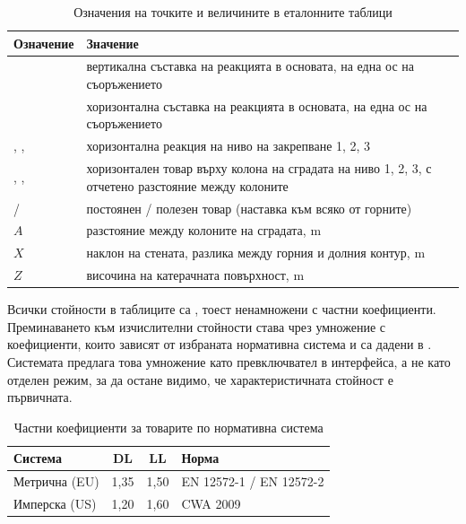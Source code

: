 \begin{table}[htbp]
\centering
\caption{Означения на точките и величините в еталонните таблици}
\label{tab:symbols}
{\fontsize{10}{12}\selectfont
\begin{tabular}{@{}lL{9.6cm}@{}}
\toprule
\textbf{Означение} & \textbf{Значение} \\
\midrule
{} & вертикална съставка на реакцията в основата, на една ос на съоръжението \\
 & хоризонтална съставка на реакцията в основата, на една ос на съоръжението \\
, ,  & хоризонтална реакция на ниво на закрепване 1, 2, 3 \\
, ,  & хоризонтален товар върху колона на сградата на ниво 1, 2, 3, с отчетено разстояние между колоните \\
 /  & постоянен / полезен товар (наставка към всяко от горните) \\
$A$ & разстояние между колоните на сградата, m \\
$X$ & наклон на стената, разлика между горния и долния контур, m \\
$Z$ & височина на катерачната повърхност, m \\
\bottomrule
\end{tabular}}
\end{table}

Всички стойности в таблиците са , тоест ненамножени с частни
коефициенти. Преминаването към изчислителни стойности става чрез умножение с
коефициенти, които зависят от избраната нормативна система и са дадени в
. Системата предлага това умножение като превключвател в
интерфейса, а не като отделен режим, за да остане видимо, че характеристичната
стойност е първичната.

\begin{table}[htbp]
\centering
\caption{Частни коефициенти за товарите по нормативна система}
\label{tab:factors}
{\fontsize{10}{12}\selectfont
\begin{tabular}{@{}lccL{5.2cm}@{}}
\toprule
\textbf{Система} & \textbf{DL} & \textbf{LL} & \textbf{Норма} \\
\midrule
Метрична (EU) & 1{,}35 & 1{,}50 & EN 12572-1 / EN 12572-2 \\
Имперска (US) & 1{,}20 & 1{,}60 & CWA 2009 \\
\bottomrule
\end{tabular}}
\end{table}

